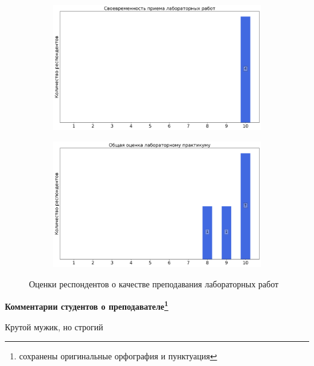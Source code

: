 \begin{figure}[H]
\begin{subfigure}[b]{0.45\textwidth}
			\end{subfigure}
			\begin{subfigure}[b]{0.45\textwidth}
				\centering
				\includegraphics[width=\textwidth]{images/1 course/Общая физика - механика/labniks-marks-Чернышов А.И.-2.png}
			\end{subfigure}
			\begin{subfigure}[b]{0.45\textwidth}
				\centering
				\includegraphics[width=\textwidth]{images/1 course/Общая физика - механика/labniks-marks-Чернышов А.И.-3.png}
			\end{subfigure}	
			\caption{Оценки респондентов о качестве преподавания лабораторных работ}
		\end{figure}

		\textbf{Комментарии студентов о преподавателе\protect\footnote{сохранены оригинальные орфография и пунктуация}}
            \begin{commentbox} 
                Крутой мужик, но строгий 
            \end{commentbox}


